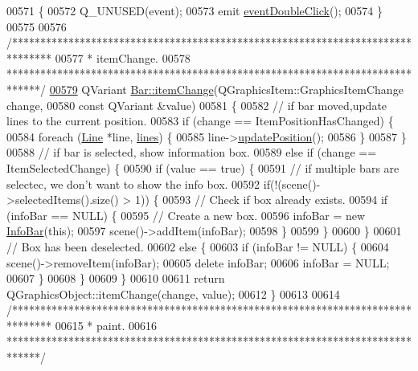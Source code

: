 \begin{DoxyCode}
00571 \{
00572   Q\_UNUSED(event);
00573   emit \hyperlink{class_bar_a66bcbd19582dddee7e171ae5a4475f4b}{eventDoubleClick}();
00574 \}
00575 
00576 \textcolor{comment}{/*******************************************************************************}
00577 \textcolor{comment}{ * itemChange.}
00578 \textcolor{comment}{ ******************************************************************************/}
\hypertarget{bar_8cpp_source_l00579}{}\hyperlink{group___models_gad97a82d618ee0c51a9a36e44339c69e6}{00579} QVariant \hyperlink{group___models_gad97a82d618ee0c51a9a36e44339c69e6}{Bar::itemChange}(QGraphicsItem::GraphicsItemChange change,
00580                          \textcolor{keyword}{const} QVariant &value)
00581 \{
00582   \textcolor{comment}{// if bar moved,update lines to the current position.}
00583   \textcolor{keywordflow}{if} (change == ItemPositionHasChanged) \{
00584     \textcolor{keywordflow}{foreach} (\hyperlink{class_line}{Line} *line, \hyperlink{class_bar_a23b6d4319352ef0e77ad66aade4e0209}{lines}) \{
00585       line->\hyperlink{group___models_ga8fdb12651d4bc592616d241386b066b3}{updatePosition}();
00586     \}
00587   \}
00588   \textcolor{comment}{// if bar is selected, show information box.}
00589   \textcolor{keywordflow}{else} \textcolor{keywordflow}{if} (change == ItemSelectedChange) \{
00590     \textcolor{keywordflow}{if} (value == \textcolor{keyword}{true}) \{
00591       \textcolor{comment}{// if multiple bars are selectec, we don't want to show the info box.}
00592       \textcolor{keywordflow}{if}(!(scene()->selectedItems().size() > 1)) \{
00593         \textcolor{comment}{// Check if box already exists.}
00594         \textcolor{keywordflow}{if} (infoBar == NULL) \{
00595           \textcolor{comment}{// Create a new box.}
00596           infoBar = \textcolor{keyword}{new} \hyperlink{class_info_bar}{InfoBar}(\textcolor{keyword}{this});
00597           scene()->addItem(infoBar);
00598         \}
00599       \}
00600     \}
00601     \textcolor{comment}{// Box has been deselected.}
00602     \textcolor{keywordflow}{else} \{
00603       \textcolor{keywordflow}{if} (infoBar != NULL) \{
00604         scene()->removeItem(infoBar);
00605         \textcolor{keyword}{delete} infoBar;
00606         infoBar = NULL;
00607       \}
00608     \}
00609   \}
00610 
00611   \textcolor{keywordflow}{return} QGraphicsObject::itemChange(change, value);
00612 \}
00613 
00614 \textcolor{comment}{/*******************************************************************************}
00615 \textcolor{comment}{ * paint.}
00616 \textcolor{comment}{ ******************************************************************************/}

\end{DoxyCode}
